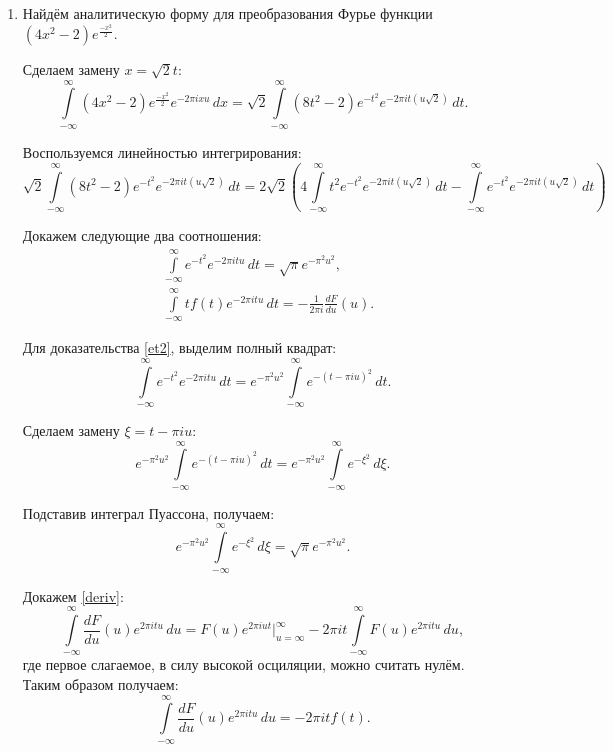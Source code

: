 {\begin{enumerate}
		\item{
			Найдём аналитическую форму для преобразования Фурье функции $(4 x^2 - 2) e^{\frac{-x^2}{2}}$.
			
			Сделаем замену $x = \sqrt{2} t$:
			\begin{equation}
			\int\limits_{-\infty}^{\infty} (4 x^2 - 2) e^{\frac{-x^2}{2}} e^{-2 \pi i x u} \,dx
			=  \sqrt{2} \int\limits_{-\infty}^{\infty} (8 t^2 - 2) e^{-t^2} e^{-2 \pi i t (u \sqrt{2})} \,dt. \nonumber
			\end{equation}
			
			Воспользуемся линейностью интегрирования:
			\begin{equation}\label{liniar}
			\sqrt{2} \int\limits_{-\infty}^{\infty} (8 t^2 - 2) e^{-t^2} e^{-2 \pi i t (u \sqrt{2})} \,dt
			= 2\sqrt{2} ( 4 \int\limits_{-\infty}^{\infty} t^2 e^{-t^2} e^{-2 \pi i t (u \sqrt{2})} \, dt - \int\limits_{-\infty}^{\infty} e^{-t^2} e^{-2 \pi i t (u \sqrt{2})} \, dt)
			\end{equation}
			
			Докажем следующие два соотношения:
			\begin{align}
			\label{et2}
			&\int\limits_{-\infty}^{\infty} e^{-t^2} e^{-2 \pi i t u} \, dt = \sqrt{\pi} e^{-\pi^2 u^2}, \\
			\label{deriv}
			&\int\limits_{-\infty}^{\infty} t f(t) e^{-2 \pi i t u} \, dt = -\frac{1}{2 \pi i} \frac{d F}{d u} (u).
			\end{align}
			
			Для доказательства \eqref{et2}, выделим полный квадрат:
			\begin{equation}
			\int\limits_{-\infty}^{\infty} e^{-t^2} e^{-2 \pi i t u} \, dt 
			= e^{-\pi^2 u^2} \int\limits_{-\infty}^{\infty} e^{-(t - \pi i u)^2} \, dt.\nonumber
			\end{equation}
			
			Сделаем замену $\xi = t - \pi i u$:
			\begin{equation}
			e^{-\pi^2 u^2} \int\limits_{-\infty}^{\infty} e^{-(t - \pi i u)^2} \, dt
			= e^{-\pi^2 u^2} \int\limits_{-\infty}^{\infty} e^{-\xi^2} \, d\xi.\nonumber
			\end{equation}
			
			Подставив интеграл Пуассона, получаем:
			\begin{equation}
			e^{-\pi^2 u^2} \int\limits_{-\infty}^{\infty} e^{-\xi^2} \, d\xi
			= \sqrt{\pi} e^{-\pi^2 u^2}.\nonumber
			\end{equation}
			
			Докажем \eqref{deriv}:
			\begin{equation*}
			\int\limits_{-\infty}^{\infty} \frac{d F}{d u} (u) e^{2 \pi i t u} \, du  = F(u) e^{2 \pi i u t} \vert_{u=\infty}^{\infty} - 2\pi i t \int\limits_{-\infty}^{\infty} F(u) e^{2 \pi i t u} \, du,
			\end{equation*}
			где первое слагаемое, в силу высокой осциляции, можно считать нулём. Таким образом получаем:
			\begin{equation*}
			\int\limits_{-\infty}^{\infty} \frac{d F}{d u} (u) e^{2 \pi i t u} \, du  = - 2\pi i t f(t).
			\end{equation*}
			
}
\end{enumerate}}
